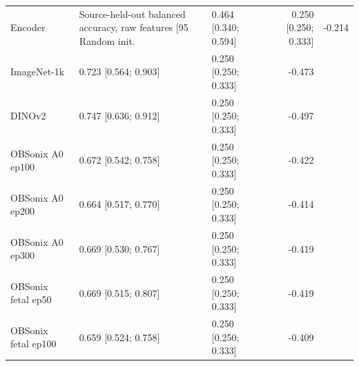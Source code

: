 \begin{tabular}{lllr}
\toprule
Encoder & Source-held-out balanced accuracy, raw features [95%
\midrule
Random init. & 0.464 [0.340; 0.594] & 0.250 [0.250; 0.333] & -0.214 \\
ImageNet-1k & 0.723 [0.564; 0.903] & 0.250 [0.250; 0.333] & -0.473 \\
DINOv2 & 0.747 [0.636; 0.912] & 0.250 [0.250; 0.333] & -0.497 \\
OBSonix A0 ep100 & 0.672 [0.542; 0.758] & 0.250 [0.250; 0.333] & -0.422 \\
OBSonix A0 ep200 & 0.664 [0.517; 0.770] & 0.250 [0.250; 0.333] & -0.414 \\
OBSonix A0 ep300 & 0.669 [0.530; 0.767] & 0.250 [0.250; 0.333] & -0.419 \\
OBSonix fetal ep50 & 0.669 [0.515; 0.807] & 0.250 [0.250; 0.333] & -0.419 \\
OBSonix fetal ep100 & 0.659 [0.524; 0.758] & 0.250 [0.250; 0.333] & -0.409 \\
\bottomrule
\end{tabular}
